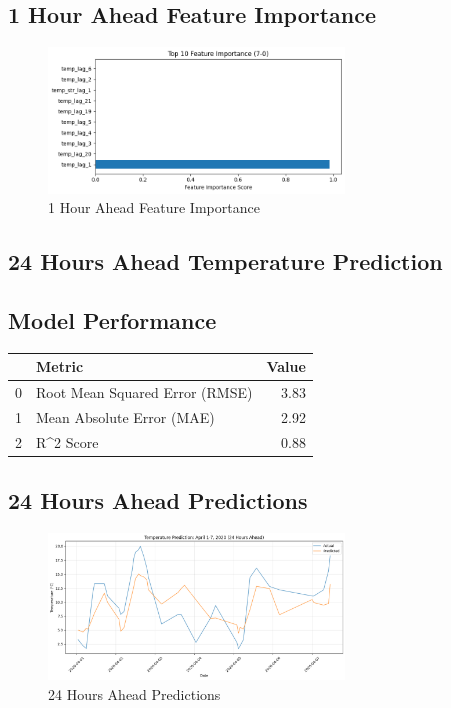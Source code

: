 \subsection{1 Hour Ahead Feature Importance}
\begin{figure}[htbp]
\centering
\includegraphics[width=0.7\textwidth]{7-0-random_forest_temp_feature_importance.png}
\caption{1 Hour Ahead Feature Importance}
\label{fig:1_hour_ahead_featimp}
\end{figure}



\subsection{24 Hours Ahead Temperature Prediction}
\subsection{Model Performance}
\begin{tabular}{llr}
\toprule
 & Metric & Value \\
\midrule
0 & Root Mean Squared Error (RMSE) & 3.83 \\
1 & Mean Absolute Error (MAE) & 2.92 \\
2 & R^2 Score & 0.88 \\
\bottomrule
\end{tabular}

\subsection{24 Hours Ahead Predictions}
\begin{figure}[htbp]
\centering
\includegraphics[width=0.7\textwidth]{7-1-random_forest_temp_prediction_results.png}
\caption{24 Hours Ahead Predictions}
\label{fig:24_hours_ahead_pred}
\end{figure}

